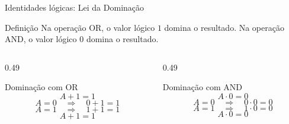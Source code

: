 
\begin{frame}{Identidades lógicas: Lei da Dominação}
    \small

    \begin{block}{Definição}
        Na operação OR, o valor lógico $1$ domina o resultado.
        Na operação AND, o valor lógico $0$ domina o resultado.
    \end{block}

    \begin{columns}[T]

        \small
        \begin{column}{0.49\textwidth}
            \begin{block}{Dominação com OR}
                \[
                    \boxed{A + 1 = 1}
                \]
                \[
                    A = 0
                    \quad\Rightarrow\quad
                    0 + 1 = 1
                \]
                \[
                    A = 1
                    \quad\Rightarrow\quad
                    1 + 1 = 1
                \]
                \[
                    \boxed{A+1=1}
                \]
            \end{block}
        \end{column}

        \small
        \begin{column}{0.49\textwidth}
            \begin{block}{Dominação com AND}
                \[
                    \boxed{A\cdot0=0}
                \]
                \[
                    A = 0
                    \quad\Rightarrow\quad
                    0\cdot0=0
                \]
                \[
                    A = 1
                    \quad\Rightarrow\quad
                    1\cdot0=0
                \]
                \[
                    \boxed{A\cdot0=0}
                \]
            \end{block}
        \end{column}

    \end{columns}

\end{frame}